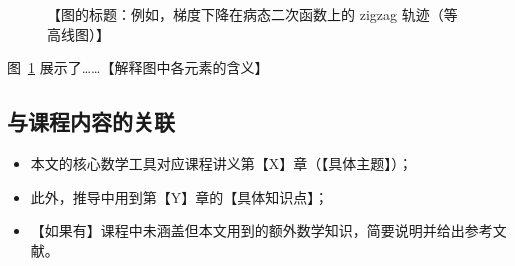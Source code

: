 
\begin{figure}[htbp]
    \centering
    \caption{【图的标题：例如，梯度下降在病态二次函数上的 zigzag 轨迹（等高线图）】}
    \label{fig:intuition}
\end{figure}

图~\ref{fig:intuition} 展示了……【解释图中各元素的含义】

\subsection{与课程内容的关联}

\begin{itemize}
    \item 本文的核心数学工具对应课程讲义第【X】章（【具体主题】）；
    \item 此外，推导中用到第【Y】章的【具体知识点】；
    \item 【如果有】课程中未涵盖但本文用到的额外数学知识，简要说明并给出参考文献。
\end{itemize}
